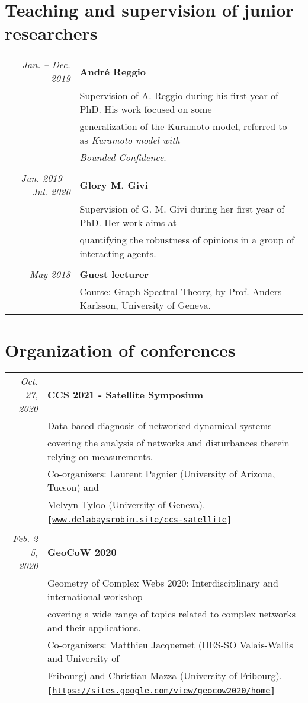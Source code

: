 \documentclass[10pt]{article}
\begin{document}
\section*{Teaching and supervision of junior researchers}
\begin{tabular}{rl}
 \textit{Jan. -- Dec. 2019} & \textbf{Andr\'e Reggio} \\
 & Supervision of A. Reggio during his first year of PhD. His work focused on some \\
 & generalization of the Kuramoto model, referred to as \emph{Kuramoto model with} \\
 & \emph{Bounded Confidence}. \\
 &\\
 \textit{Jun. 2019 -- Jul. 2020} & \textbf{Glory M. Givi} \\
 & Supervision of G. M. Givi during her first year of PhD. Her work aims at \\
 & quantifying the robustness of opinions in a group of interacting agents. \\
 &\\
 \textit{May 2018} & \textbf{Guest lecturer} \\ 	
 & Course: Graph Spectral Theory, by Prof. Anders Karlsson, University of Geneva.
\end{tabular}

\section*{Organization of conferences}
\begin{tabular}{rl}
 \textit{Oct. 27, 2020} & \textbf{CCS 2021 - Satellite Symposium} \\
 & Data-based diagnosis of networked dynamical systems \\
 & covering the analysis of networks and disturbances therein relying on measurements. \\
 & Co-organizers: Laurent Pagnier (University of Arizona, Tucson) and \\ 
 & Melvyn Tyloo (University of Geneva). \\
 & {\footnotesize \tt [\url{www.delabaysrobin.site/ccs-satellite}]} \\
 &\\
 \textit{Feb. 2 -- 5, 2020} & \textbf{GeoCoW 2020}  \\
 & Geometry of Complex Webs 2020: Interdisciplinary and international workshop \\
 & covering a wide range of topics related to complex networks and their applications. \\
 & Co-organizers: Matthieu Jacquemet (HES-SO Valais-Wallis and University of \\ 
 & Fribourg) and Christian Mazza (University of Fribourg). \\
 & {\footnotesize \tt [\url{https://sites.google.com/view/geocow2020/home}]} 
\end{tabular}
\end{document}
